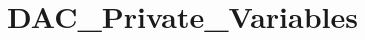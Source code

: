 \hypertarget{group___d_a_c___private___variables}{\section{D\-A\-C\-\_\-\-Private\-\_\-\-Variables}
\label{group___d_a_c___private___variables}
}
